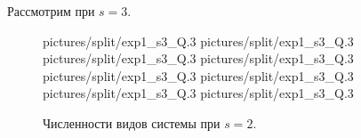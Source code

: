 Рассмотрим при \(s=3\).
\begin{figure}[H]
    \centering
       {pictures/split/exp1_s3_Q}{.3}
      {pictures/split/exp1_s3_Q}{.3}
      {pictures/split/exp1_s3_Q}{.3}
      {pictures/split/exp1_s3_Q}{.3}
      {pictures/split/exp1_s3_Q}{.3}
      {pictures/split/exp1_s3_Q}{.3}
     {pictures/split/exp1_s3_Q}{.3}
     {pictures/split/exp1_s3_Q}{.3}
\caption{Численности видов системы при \(s=2\).}  \label{fig:split_exp1_s3}
\end{figure}